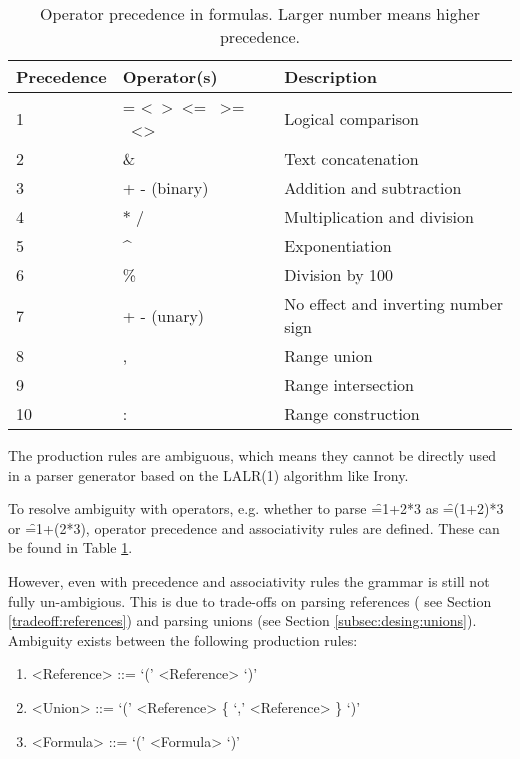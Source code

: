\begin{table}
\small
\centering
\begin{tabular}{lll}
	\toprule
	Precedence & Operator(s) & Description \\
	\midrule
	1 & = \textless \  \textgreater \  \textless= \  \textgreater= \  \textless\textgreater   & Logical comparison       \\
	2 & \& & Text concatenation \\
	3 & + - (binary) & Addition and subtraction \\
	4 & $\ast$ / & Multiplication and division \\
	5 & \textasciicircum & Exponentiation \\
	6 & \% & Division by 100 \\
	7 & + - (unary) & No effect and inverting number sign \\
	8 & , & Range union \\
	9 & \texttt{\char32} & Range intersection \\
	10 & : & Range construction \\
	\bottomrule
\end{tabular}
\caption{Operator precedence in formulas. Larger number means higher precedence.}
\label{table:operatorprec}
\end{table}


The production rules are ambiguous, which means they cannot be directly used in a parser generator based on the LALR(1) algorithm like Irony.

To resolve ambiguity with operators, e.g. whether to parse \f{=1+2*3} as \f{=(1+2)*3} or \f{=1+(2*3)}, operator precedence and associativity rules are defined.
These can be found in Table \ref{table:operatorprec}.

However, even with precedence and associativity rules the grammar is still not fully un-ambigious.
This is due to trade-offs on parsing references ( see Section \ref{tradeoff:references}) and parsing unions (see Section \ref{subsec:desing:unions}).
Ambiguity exists between the following production rules:
\begin{enumerate}
	\item \begin{grammar}<Reference> ::= `(' <Reference> `)'\end{grammar}
	\item \begin{grammar}<Union> ::= `(' <Reference> \{ `,' <Reference> \} `)'\end{grammar}
	\item \begin{grammar}<Formula> ::= `(' <Formula> `)'\end{grammar}
\end{enumerate}

